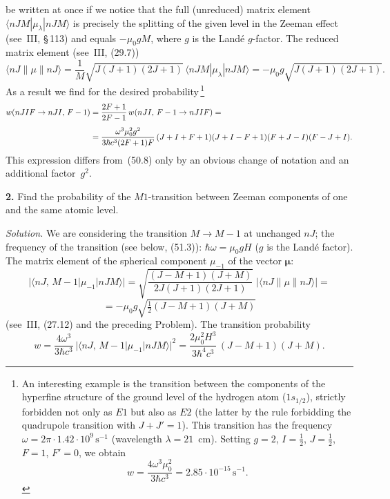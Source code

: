 be written at once if we notice that the full (unreduced) matrix element $\langle nJM|\mu_\lambda|nJM\rangle$ is precisely the splitting of the given level in the Zeeman effect (see~III, \S\,113) and equals $-\mu_0 gM$, where $g$ is the Land\'e $g$-factor. The reduced matrix element (see~III, (29.7))
\[
\langle nJ\|\mu\|nJ\rangle = \frac{1}{M}\sqrt{J(J+1)(2J+1)}\,\langle nJM|\mu_\lambda|nJM\rangle = -\mu_0 g\sqrt{J(J+1)(2J+1)}.
\]
As a result we find for the desired probability\,\footnote{An interesting example is the transition between the components of the hyperfine structure of the ground level of the hydrogen atom ($1s_{1/2}$), strictly forbidden not only as $E1$ but also as $E2$ (the latter by the rule forbidding the quadrupole transition with $J + J' = 1$). This transition has the frequency $\omega = 2\pi \cdot 1.42 \cdot 10^9\,\text{s}^{-1}$ (wavelength $\lambda = 21$~cm). Setting $g = 2$, $I = \tfrac{1}{2}$, $J = \tfrac{1}{2}$, $F = 1$, $F' = 0$, we obtain
\[
w = \frac{4\omega^3\mu^2_0}{3\hbar c^3} = 2.85 \cdot 10^{-15}\,\text{s}^{-1}.
\]}
\begin{align}
w(nJIF \to nJI,\,F-1) &= \frac{2F+1}{2F-1}\,w(nJI,\,F-1 \to nJIF) ={}\notag\\[4pt]
&= \frac{\omega^3\mu^2_0 g^2}{3\hbar c^3(2F+1)F}\,(J+I+F+1)(J+I-F+1)(F+J-I)(F-J+I).
\end{align}
This expression differs from~(50.8) only by an obvious change of notation and an additional factor~$g^2$.

\textbf{2.} Find the probability of the $M1$-transition between Zeeman components of one and the same atomic level.

\textit{Solution.} We are considering the transition $M \to M - 1$ at unchanged $nJ$; the frequency of the transition (see below, (51.3)): $\hbar\omega = \mu_0 gH$ ($g$ is the Land\'e factor). The matrix element of the spherical component $\mu_{-1}$ of the vector $\boldsymbol{\mu}$:
\[
|\langle nJ,\,M-1|\mu_{-1}|nJM\rangle| = \sqrt{\frac{(J-M+1)(J+M)}{2J(J+1)(2J+1)}}\;|\langle nJ\|\mu\|nJ\rangle| =
\]
\[
= -\mu_0 g\sqrt{\tfrac{1}{2}(J-M+1)(J+M)}
\]
(see~III, (27.12) and the preceding Problem). The transition probability
\[
w = \frac{4\omega^3}{3\hbar c^3}\,|\langle nJ,\,M-1|\mu_{-1}|nJM\rangle|^2 = \frac{2\mu^2_0 H^3}{3\hbar^4c^3}\,(J-M+1)(J+M).
\]

